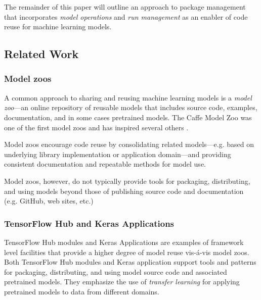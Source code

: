 \documentclass{article}
\begin{document}
\iffalse
While models may be represented in part by traditional installed
software---e.g. an imperative TensorFlow program that defines a model
graph structure when executed---models require more to be construed as
reusable code: \emph{models must support operations on novel data}. If
they cannot be applied to novel data---either for training or for
inference---they cannot be considered reusable software.
\fi

The remainder of this paper will outline an approach to package
management that incorporates \emph{model operations} and \emph{run
  management} as an enabler of code reuse for machine learning models.

\subsection{Related Work}

\subsubsection{Model zoos}

A common approach to sharing and reusing machine learning models is a
\emph{model zoo}---an online repository of reusable models that
includes source code, examples, documentation, and in some cases
pretrained models. The Caffe Model Zoo \cite{caffezoo} was one of the
first model zoos and has inspired several others \cite{tfzoo,mxzoo}.

Model zoos encourage code reuse by consolidating related
models---e.g. based on underlying library implementation or
application domain---and providing consistent documentation and
repeatable methods for model use.

Model zoos, however, do not typically provide tools for packaging,
distributing, and using models beyond those of publishing source code
and documentation (e.g. GitHub, web sites, etc.)

\subsubsection{TensorFlow Hub and Keras Applications}

TensorFlow Hub modules \cite{tfhub} and Keras Applications
\cite{kerasapps} are examples of framework level facilities that
provide a higher degree of model reuse vis-\'a-vis model zoos. Both
TensorFlow Hub modules and Keras application support tools and
patterns for packaging, distributing, and using model source code and
associated pretrained models. They emphasize the use of \emph{transfer
  learning} for applying pretrained models to data from different
domains.
\end{document}
